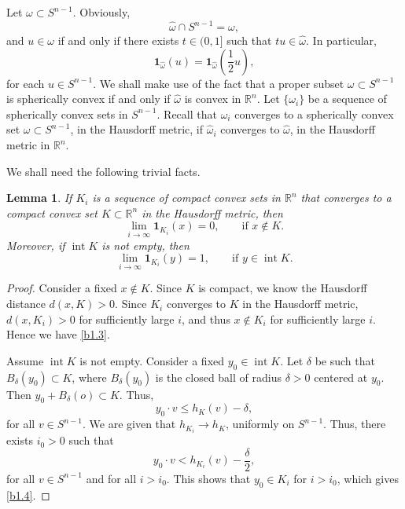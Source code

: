 \documentclass{cpamart1}     %
\newtheorem{lemm}[theo]{Lemma}
\theoremstyle{definition}
\theoremstyle{remark}
\newcommand{\rn}{\mathbb R^n}
\newcommand{\sn}{S^{n-1}}
\newcommand{\chara}[1]{{\mathbf{1}_{#1}}}
\DeclareMathOperator{\Int}{int}
\begin{document}
Let $\omega\subset S^{n-1}$.
Obviously,
\begin{equation}
\label{b1.1}
\hat{\omega}\cap S^{n-1}=\omega,
\end{equation}
and $u\in \omega$ if and only if there exists
$t\in (0,1]$ such that $t u\in \hat{\omega}$. In particular,
\begin{equation}
\label{b1.2}
\chara{\hat{\omega}}(u)=\chara{\hat{\omega}}(\textstyle\frac12 u),
\end{equation}
for each $u\in S^{n-1}$. We shall make use of the fact that a proper subset $\omega \subset \sn$
is spherically convex
 if and only if $\hat{\omega}$ is convex in $\mathbb{R}^n$.
 Let $\{\omega_i\}$ be a sequence
  of spherically convex sets in $S^{n-1}$. Recall that $\omega_i$ converges to a
  spherically convex set $\omega\subset S^{n-1}$, in the Hausdorff metric, if
  ${\hat{\omega}_i}$ converges to $\hat{\omega}$, in the Hausdorff metric in $\rn$.


We shall need the following trivial facts.


\begin{lemm}\label{b0}
If $K_i$ is a sequence of compact convex sets in $\mathbb{R}^n$
that converges to a compact convex set $K\subset \mathbb{R}^n$
in the Hausdorff metric, then
\begin{equation}
\label{b1.3}
\lim_{i\rightarrow \infty}\chara{K_i}(x)=0, \qquad\text{if } x \notin K.
\end{equation}
Moreover, if $\Int K$ is not empty, then
\begin{equation}
\label{b1.4}
\lim_{i\rightarrow \infty}\chara{K_i}(y)=1,\qquad \text{if } y \in \Int K.
\end{equation}
\end{lemm}
\begin{proof}
Consider a fixed $x\notin K$. Since $K$ is compact, we know the Hausdorff
distance $d(x,K)>0$.
Since $K_i$ converges to $K$ in the Hausdorff metric, $d(x, K_i)>0$ for
sufficiently large $i$,  and thus $x\notin K_i$ for
sufficiently large $i$. Hence we have \eqref{b1.3}.

Assume $\Int K$ is not empty. Consider a fixed $y_0\in \Int K$. Let
$\delta$ be such that $B_{\delta}(y_0)\subset K$, where $B_\delta(y_0)$
is the closed ball of radius $\delta>0$ centered at $y_0$. Then
$y_0+B_\delta(o)  \subset K$. Thus,
\begin{equation*}
y_0\cdot v\leq h_{K}(v)-\delta,
\end{equation*}
for all $v\in \sn$.
We are given that $h_{K_i} \to h_K$, uniformly on $\sn$. Thus, there exists $i_0>0$ such that
\begin{equation*}
y_0\cdot v<h_{K_i}(v) - \textstyle\frac\delta 2,
\end{equation*}
for all $v\in S^{n-1}$ and for all $i>i_0$.
This shows that $y_0\in K_i$ for $i>i_0$, which gives \eqref{b1.4}.
\end{proof}
\end{document}
